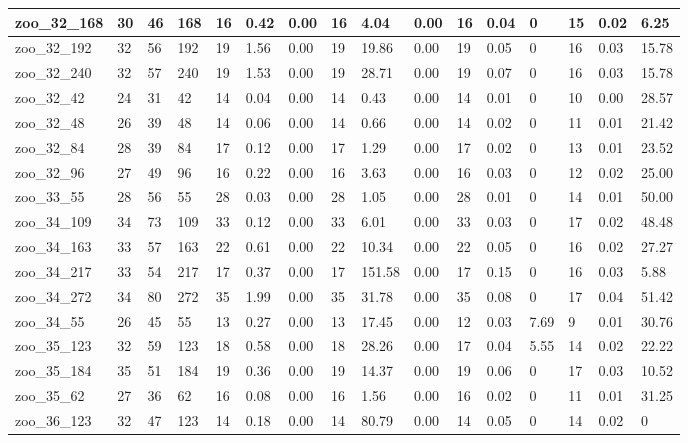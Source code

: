\begin{landscape}
\begin{longtable}{llllllllllllllll}
zoo\_32\_168 & 30 & 46 & 168 & 16 & 0.42 & 0.00 & 16 & 4.04 & 0.00 & 16 & 0.04 & 0 & 15 & 0.02 & 6.25 \\ \hline 
zoo\_32\_192 & 32 & 56 & 192 & 19 & 1.56 & 0.00 & 19 & 19.86 & 0.00 & 19 & 0.05 & 0 & 16 & 0.03 & 15.78 \\ \hline 
zoo\_32\_240 & 32 & 57 & 240 & 19 & 1.53 & 0.00 & 19 & 28.71 & 0.00 & 19 & 0.07 & 0 & 16 & 0.03 & 15.78 \\ \hline 
zoo\_32\_42 & 24 & 31 & 42 & 14 & 0.04 & 0.00 & 14 & 0.43 & 0.00 & 14 & 0.01 & 0 & 10 & 0.00 & 28.57 \\ \hline 
zoo\_32\_48 & 26 & 39 & 48 & 14 & 0.06 & 0.00 & 14 & 0.66 & 0.00 & 14 & 0.02 & 0 & 11 & 0.01 & 21.42 \\ \hline 
zoo\_32\_84 & 28 & 39 & 84 & 17 & 0.12 & 0.00 & 17 & 1.29 & 0.00 & 17 & 0.02 & 0 & 13 & 0.01 & 23.52 \\ \hline 
zoo\_32\_96 & 27 & 49 & 96 & 16 & 0.22 & 0.00 & 16 & 3.63 & 0.00 & 16 & 0.03 & 0 & 12 & 0.02 & 25.00 \\ \hline 
zoo\_33\_55 & 28 & 56 & 55 & 28 & 0.03 & 0.00 & 28 & 1.05 & 0.00 & 28 & 0.01 & 0 & 14 & 0.01 & 50.00 \\ \hline 
zoo\_34\_109 & 34 & 73 & 109 & 33 & 0.12 & 0.00 & 33 & 6.01 & 0.00 & 33 & 0.03 & 0 & 17 & 0.02 & 48.48 \\ \hline 
zoo\_34\_163 & 33 & 57 & 163 & 22 & 0.61 & 0.00 & 22 & 10.34 & 0.00 & 22 & 0.05 & 0 & 16 & 0.02 & 27.27 \\ \hline 
zoo\_34\_217 & 33 & 54 & 217 & 17 & 0.37 & 0.00 & 17 & 151.58 & 0.00 & 17 & 0.15 & 0 & 16 & 0.03 & 5.88 \\ \hline 
zoo\_34\_272 & 34 & 80 & 272 & 35 & 1.99 & 0.00 & 35 & 31.78 & 0.00 & 35 & 0.08 & 0 & 17 & 0.04 & 51.42 \\ \hline 
zoo\_34\_55 & 26 & 45 & 55 & 13 & 0.27 & 0.00 & 13 & 17.45 & 0.00 & 12 & 0.03 & 7.69 & 9 & 0.01 & 30.76 \\ \hline 
zoo\_35\_123 & 32 & 59 & 123 & 18 & 0.58 & 0.00 & 18 & 28.26 & 0.00 & 17 & 0.04 & 5.55 & 14 & 0.02 & 22.22 \\ \hline 
zoo\_35\_184 & 35 & 51 & 184 & 19 & 0.36 & 0.00 & 19 & 14.37 & 0.00 & 19 & 0.06 & 0 & 17 & 0.03 & 10.52 \\ \hline 
zoo\_35\_62 & 27 & 36 & 62 & 16 & 0.08 & 0.00 & 16 & 1.56 & 0.00 & 16 & 0.02 & 0 & 11 & 0.01 & 31.25 \\ \hline 
zoo\_36\_123 & 32 & 47 & 123 & 14 & 0.18 & 0.00 & 14 & 80.79 & 0.00 & 14 & 0.05 & 0 & 14 & 0.02 & 0 \\ \hline 

\end{longtable}
\end{landscape}
